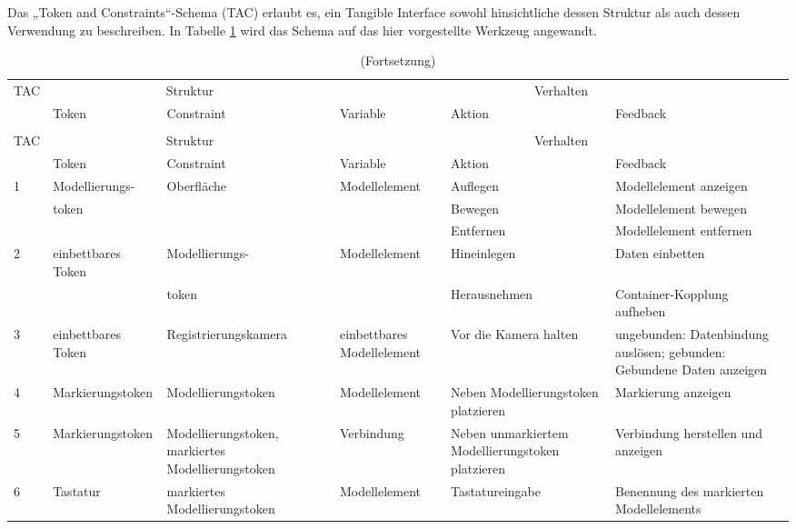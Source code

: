 Das „Token and Constraints“-Schema (\gls{TAC}) erlaubt es, ein Tangible Interface sowohl hinsichtliche dessen Struktur als auch dessen Verwendung zu beschreiben. In Tabelle \ref{tab:tac} wird das Schema auf das hier vorgestellte Werkzeug angewandt. 
\todo
	\begin{longtable}{| p{0.8cm} || p{2.2cm} | p{2cm} || p{2cm} | p{2cm} | p{3cm} |} \caption{Spezifikation des Werkzeug mittels TAC-Schema}\label{tab:tac} \\ \hline	 
		TAC & \multicolumn{2}{|c||}{Struktur} & \multicolumn{3}{c|}{Verhalten} \\ 
		& Token & Constraint & Variable & Aktion & Feedback \\ \hline \hline
		\endfirsthead 
		\caption[]{(Fortsetzung)}\\ 
		\hline
			TAC & \multicolumn{2}{|c||}{Struktur} & \multicolumn{3}{c|}{Verhalten} \\ \hline 
			& Token & Constraint & Variable & Aktion & Feedback \\ \hline \hline
		\endhead
		\multirow{3}{*}{1} & Modell\-ierungs-  & Oberfläche & Modell\-element  & Auflegen & Modell\-element anzeigen \\ \cline{5-6} 
						   & token &			   &  & Bewegen & Modell\-element bewegen \\ \cline{5-6} 
						   & 	  &			   &		  & Entfernen & Modell\-element entfernen \\ \hline
		\multirow{2}{*}{2} & einbett\-bares Token & Modell\-ierungs-    & Modell\-element		  & Hinein\-legen & Daten einbetten \\ \cline{5-6}
						   &  & token   &  & Heraus\-nehmen & Container-Kopplung aufheben \\ \hline
		3 & einbett\-bares Token & Regist\-rierungs\-kamera & einbett\-bares Modell\-element & Vor die Kamera halten & ungebunden: Datenbindung auslösen; gebunden: Gebundene Daten anzeigen \\ \hline
		4 & Markierungs\-token & Modell\-ierungs\-token & Modell\-element & Neben Modell\-ierungs\-token platzieren	& Markierung anzeigen \\ \hline
		5 & Markierungs\-token & Modell\-ierungs\-token, markiertes Modell\-ierungs\-token & Verbindung & Neben unmarkiertem Modell\-ierungs\-token platzieren	& Verbindung herstellen und anzeigen \\ \hline  
		6 & Tastatur & markiertes Modell\-ierungs\-token & Modell\-element & Tastatur\-eingabe & Benennung des markierten Modellelements \\ \hline

\end{longtable}
